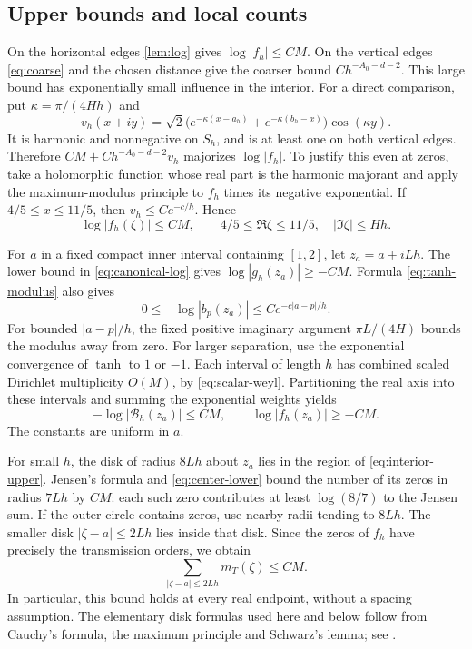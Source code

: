 \documentclass[11pt,a4paper]{article}
\theoremstyle{remark}
\numberwithin{equation}{section}
\begin{document}
\subsection{Upper bounds and local counts}
On the horizontal edges \cref{lem:log} gives
$\log|f_h|\le CM$. On the vertical edges \eqref{eq:coarse} and the
chosen distance give the coarser bound $Ch^{-A_0-d-2}$.
This large bound has exponentially small influence in the interior.
For a direct comparison, put $\kappa=\pi/(4Hh)$ and
\[
 v_h(x+iy)=\sqrt2\big(e^{-\kappa(x-a_h)}
                  +e^{-\kappa(b_h-x)}\big)\cos(\kappa y).
\]
It is harmonic and nonnegative on $S_h$, and is at least one on both
vertical edges. Therefore $CM+Ch^{-A_0-d-2}v_h$ majorizes
$\log|f_h|$. To justify this even at zeros, take a holomorphic function
whose real part is the harmonic majorant and apply the maximum-modulus
principle to $f_h$ times its negative exponential. If
$4/5\le x\le11/5$, then $v_h\le Ce^{-c/h}$. Hence
\begin{equation}\label{eq:interior-upper}
 \log|f_h(\zeta)|\le CM,
 \qquad 4/5\le\Re\zeta\le11/5,\quad |\Im\zeta|\le Hh.
\end{equation}

For $a$ in a fixed compact inner interval containing $[1,2]$, let
$z_a=a+iLh$. The lower bound in \eqref{eq:canonical-log} gives
$\log|g_h(z_a)|\ge-CM$. Formula \eqref{eq:tanh-modulus} also gives
\begin{equation}\label{eq:pole-weight}
 0\le-\log|b_p(z_a)|\le Ce^{-c|a-p|/h}.
\end{equation}
For bounded $|a-p|/h$, the fixed positive imaginary argument
$\pi L/(4H)$ bounds the modulus away from zero. For larger separation,
use the exponential convergence of $\tanh$ to $1$ or $-1$.
Each interval of length $h$ has combined scaled Dirichlet multiplicity
$O(M)$, by \eqref{eq:scalar-weyl}. Partitioning the real axis into
these intervals and summing the exponential weights yields
\begin{equation}\label{eq:center-lower}
 -\log|\mathcal B_h(z_a)|\le CM,\qquad
 \log|f_h(z_a)|\ge-CM.
\end{equation}
The constants are uniform in $a$.

For small $h$, the disk of radius $8Lh$ about $z_a$ lies in the region
of \eqref{eq:interior-upper}. Jensen's formula and
\eqref{eq:center-lower} bound the number of its zeros in radius $7Lh$
by $CM$: each such zero contributes at least $\log(8/7)$ to the
Jensen sum. If the outer circle contains zeros, use nearby radii tending
to $8Lh$. The smaller disk $|\zeta-a|\le2Lh$ lies inside that disk.
Since the zeros of $f_h$ have precisely the transmission orders, we obtain
\begin{equation}\label{eq:local-TE}
 \sum_{|\zeta-a|\le2Lh}m_T(\zeta)\le CM.
\end{equation}
In particular, this bound holds at every real endpoint, without a
spacing assumption. The elementary disk formulas used here and below
follow from Cauchy's formula, the maximum principle and Schwarz's lemma;
see \cite[Sections~6--8, 13 and 17]{Bonk}.
\end{document}
